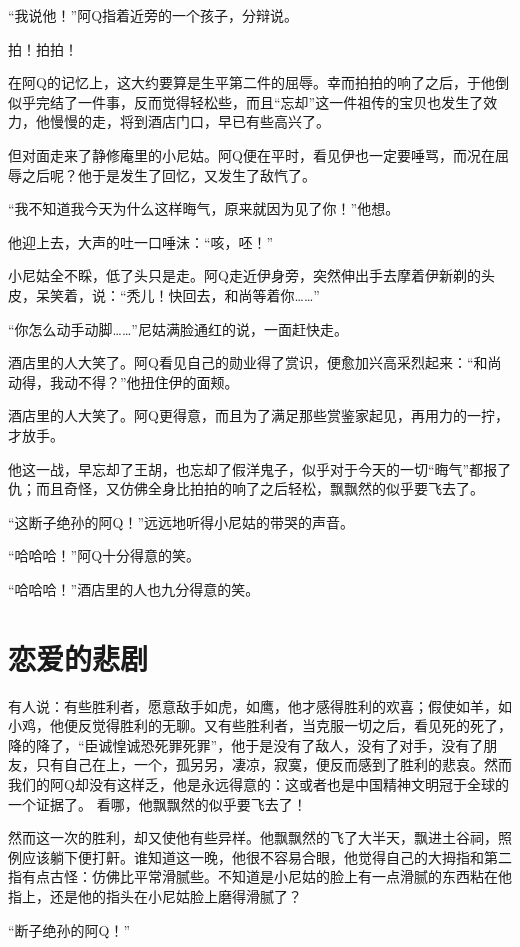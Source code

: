 \documentclass[12pt,UTF8]{ctexbook}
\begin{document}
“我说他！”阿Q指着近旁的一个孩子，分辩说。

拍！拍拍！

在阿Q的记忆上，这大约要算是生平第二件的屈辱。幸而拍拍的响了之后，于他倒似乎完结了一件事，反而觉得轻松些，而且“忘却”这一件祖传的宝贝也发生了效力，他慢慢的走，将到酒店门口，早已有些高兴了。

但对面走来了静修庵里的小尼姑。阿Q便在平时，看见伊也一定要唾骂，而况在屈辱之后呢？他于是发生了回忆，又发生了敌忾了。

“我不知道我今天为什么这样晦气，原来就因为见了你！”他想。

他迎上去，大声的吐一口唾沫：“咳，呸！”

小尼姑全不睬，低了头只是走。阿Q走近伊身旁，突然伸出手去摩着伊新剃的头皮，呆笑着，说：“秃儿！快回去，和尚等着你……”

“你怎么动手动脚……”尼姑满脸通红的说，一面赶快走。

酒店里的人大笑了。阿Q看见自己的勋业得了赏识，便愈加兴高采烈起来：“和尚动得，我动不得？”他扭住伊的面颊。

酒店里的人大笑了。阿Q更得意，而且为了满足那些赏鉴家起见，再用力的一拧，才放手。

他这一战，早忘却了王胡，也忘却了假洋鬼子，似乎对于今天的一切“晦气”都报了仇；而且奇怪，又仿佛全身比拍拍的响了之后轻松，飘飘然的似乎要飞去了。

“这断子绝孙的阿Q！”远远地听得小尼姑的带哭的声音。

“哈哈哈！”阿Q十分得意的笑。

“哈哈哈！”酒店里的人也九分得意的笑。

\chapter{恋爱的悲剧}

有人说：有些胜利者，愿意敌手如虎，如鹰，他才感得胜利的欢喜；假使如羊，如小鸡，他便反觉得胜利的无聊。又有些胜利者，当克服一切之后，看见死的死了，降的降了，“臣诚惶诚恐死罪死罪”，他于是没有了敌人，没有了对手，没有了朋友，只有自己在上，一个，孤另另，凄凉，寂寞，便反而感到了胜利的悲哀。然而我们的阿Q却没有这样乏，他是永远得意的：这或者也是中国精神文明冠于全球的一个证据了。
看哪，他飘飘然的似乎要飞去了！

然而这一次的胜利，却又使他有些异样。他飘飘然的飞了大半天，飘进土谷祠，照例应该躺下便打鼾。谁知道这一晚，他很不容易合眼，他觉得自己的大拇指和第二指有点古怪：仿佛比平常滑腻些。不知道是小尼姑的脸上有一点滑腻的东西粘在他指上，还是他的指头在小尼姑脸上磨得滑腻了？

“断子绝孙的阿Q！”
\end{document}
